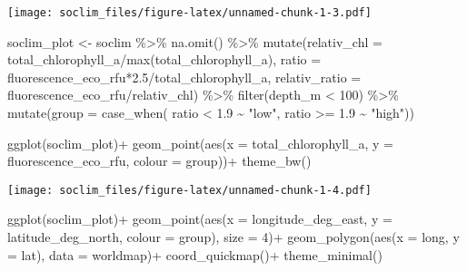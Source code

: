 \documentclass[
]{article}
\newenvironment{Shaded}{\begin{snugshade}}{\end{snugshade}}
\newcommand{\AttributeTok}[1]{\textcolor[rgb]{0.77,0.63,0.00}{#1}}
\newcommand{\DecValTok}[1]{\textcolor[rgb]{0.00,0.00,0.81}{#1}}
\newcommand{\FloatTok}[1]{\textcolor[rgb]{0.00,0.00,0.81}{#1}}
\newcommand{\FunctionTok}[1]{\textcolor[rgb]{0.00,0.00,0.00}{#1}}
\newcommand{\NormalTok}[1]{#1}
\newcommand{\OtherTok}[1]{\textcolor[rgb]{0.56,0.35,0.01}{#1}}
\newcommand{\SpecialCharTok}[1]{\textcolor[rgb]{0.00,0.00,0.00}{#1}}
\newcommand{\StringTok}[1]{\textcolor[rgb]{0.31,0.60,0.02}{#1}}
\begin{document}
\texttt{[image: soclim\_files/figure-latex/unnamed-chunk-1-3.pdf]}

\begin{Shaded}
\begin{Highlighting}[]
\NormalTok{soclim\_plot }\OtherTok{\textless{}{-}}\NormalTok{ soclim }\SpecialCharTok{\%\textgreater{}\%} \FunctionTok{na.omit}\NormalTok{() }\SpecialCharTok{\%\textgreater{}\%}
  \FunctionTok{mutate}\NormalTok{(}\AttributeTok{relativ\_chl =}\NormalTok{ total\_chlorophyll\_a}\SpecialCharTok{/}\FunctionTok{max}\NormalTok{(total\_chlorophyll\_a),}
         \AttributeTok{ratio =}\NormalTok{ fluorescence\_eco\_rfu}\SpecialCharTok{*}\FloatTok{2.5}\SpecialCharTok{/}\NormalTok{total\_chlorophyll\_a,}
         \AttributeTok{relativ\_ratio =}\NormalTok{ fluorescence\_eco\_rfu}\SpecialCharTok{/}\NormalTok{relativ\_chl) }\SpecialCharTok{\%\textgreater{}\%} 
  \FunctionTok{filter}\NormalTok{(depth\_m }\SpecialCharTok{\textless{}} \DecValTok{100}\NormalTok{) }\SpecialCharTok{\%\textgreater{}\%} 
  \FunctionTok{mutate}\NormalTok{(}\AttributeTok{group =} \FunctionTok{case\_when}\NormalTok{(}
\NormalTok{    ratio }\SpecialCharTok{\textless{}} \FloatTok{1.9} \SpecialCharTok{\textasciitilde{}} \StringTok{"low"}\NormalTok{,}
\NormalTok{    ratio }\SpecialCharTok{\textgreater{}=} \FloatTok{1.9} \SpecialCharTok{\textasciitilde{}} \StringTok{"high"}\NormalTok{))}

\FunctionTok{ggplot}\NormalTok{(soclim\_plot)}\SpecialCharTok{+}
  \FunctionTok{geom\_point}\NormalTok{(}\FunctionTok{aes}\NormalTok{(}\AttributeTok{x =}\NormalTok{ total\_chlorophyll\_a, }\AttributeTok{y =}\NormalTok{ fluorescence\_eco\_rfu, }\AttributeTok{colour =}\NormalTok{ group))}\SpecialCharTok{+}
  \FunctionTok{theme\_bw}\NormalTok{()}
\end{Highlighting}
\end{Shaded}

\texttt{[image: soclim\_files/figure-latex/unnamed-chunk-1-4.pdf]}

\begin{Shaded}
\begin{Highlighting}[]
\FunctionTok{ggplot}\NormalTok{(soclim\_plot)}\SpecialCharTok{+}
  \FunctionTok{geom\_point}\NormalTok{(}\FunctionTok{aes}\NormalTok{(}\AttributeTok{x =}\NormalTok{ longitude\_deg\_east, }\AttributeTok{y =}\NormalTok{ latitude\_deg\_north, }\AttributeTok{colour =}\NormalTok{ group), }\AttributeTok{size =} \DecValTok{4}\NormalTok{)}\SpecialCharTok{+}
  \FunctionTok{geom\_polygon}\NormalTok{(}\FunctionTok{aes}\NormalTok{(}\AttributeTok{x =}\NormalTok{ long, }\AttributeTok{y =}\NormalTok{ lat), }\AttributeTok{data =}\NormalTok{ worldmap)}\SpecialCharTok{+}
  \FunctionTok{coord\_quickmap}\NormalTok{()}\SpecialCharTok{+}
  \FunctionTok{theme\_minimal}\NormalTok{()}
\end{Highlighting}
\end{Shaded}
\end{document}

